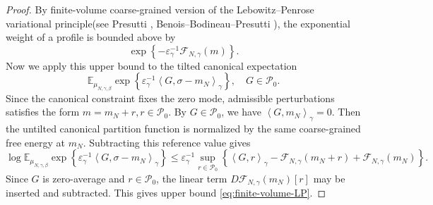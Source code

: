 \documentclass{article}
\begin{document}
\begin{proof}
By finite-volume coarse-grained version of the Lebowitz--Penrose variational principle(see Presutti \cite{Presutti2009Scaling}, Benois--Bodineau--Presutti \cite{BenoisBodineauPresutti1998}), the exponential weight of a profile is bounded above by
\[
\exp\left\{-\varepsilon_\gamma^{-1}\mathcal F_{N,\gamma}(m)
\right\}.
\]
Now we apply this upper bound to the tilted canonical expectation
\[
\mathbb E_{\mu_{N,\gamma,\beta}}
\exp\left\{
\varepsilon_\gamma^{-1}
\left\langle G,\sigma-m_N\right\rangle_\gamma
\right\}, \quad G\in\mathcal P_0.
\]
Since the canonical constraint fixes the zero mode, admissible perturbations satisfies the form \(m=m_N+r, r\in\mathcal P_0\).  By \(G\in\mathcal P_0\), we have
\(
\left\langle G,m_N\right\rangle_\gamma=0.
\)
Then the untilted canonical partition function is normalized by the same coarse-grained free energy at \(m_N\).  Subtracting this reference value gives
\[
\log
\mathbb E_{\mu_{N,\gamma,\beta}}
\exp\left\{
\varepsilon_\gamma^{-1}
\left\langle G,\sigma-m_N\right\rangle_\gamma
\right\}
\le
\varepsilon_\gamma^{-1}
\sup_{r\in\mathcal P_0}
\left\{
\left\langle G,r\right\rangle_\gamma
-
\mathcal F_{N,\gamma}(m_N+r)
+
\mathcal F_{N,\gamma}(m_N)
\right\}.
\]
Since \(G\) is zero-average and \(r\in\mathcal P_0\), the linear term
\(D\mathcal F_{N,\gamma}(m_N)[r]\) may be inserted and subtracted.  This gives
upper bound \eqref{eq:finite-volume-LP}.


\end{proof}
\end{document}
